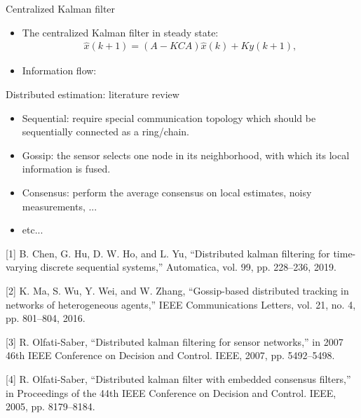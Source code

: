 \documentclass[10pt]{beamer}
\DeclareMathOperator{\1}{\textbf{1}}
\begin{document}
\begin{frame}{Centralized Kalman filter}
\begin{itemize}
\item The centralized Kalman filter in steady state:
\begin{align*}
\hat x(k+1)=(A-KCA)\hat x(k)+Ky(k+1),
\end{align*}
\item Information flow:
\begin{figure}
	\centering
	\resizebox{0.5\textwidth}{!}{}
\end{figure}
\end{itemize}
\end{frame}

\begin{frame}{Distributed estimation: literature review}
\begin{itemize}
	\item Sequential: require special communication topology which should be sequentially connected as a ring/chain.
	\item Gossip: the sensor selects one node in its neighborhood, with which its local information is fused.
	\item Consensus: perform the average consensus on local estimates, noisy measurements, ... 
	\item etc...
\end{itemize}
{\scriptsize [1] B. Chen, G. Hu, D. W. Ho, and L. Yu, ``Distributed kalman filtering
for time-varying discrete sequential systems,” Automatica, vol. 99, pp.
228–236, 2019.

[2] K. Ma, S. Wu, Y. Wei, and W. Zhang, ``Gossip-based distributed tracking
in networks of heterogeneous agents,” IEEE Communications Letters,
vol. 21, no. 4, pp. 801–804, 2016.

[3] R. Olfati-Saber, ``Distributed kalman filtering for sensor networks,” in
2007 46th IEEE Conference on Decision and Control. IEEE, 2007, pp.
5492–5498.

[4] R. Olfati-Saber, ``Distributed kalman filter with embedded consensus filters,” in
Proceedings of the 44th IEEE Conference on Decision and Control.
IEEE, 2005, pp. 8179–8184.

}
\end{frame}
\end{document}
